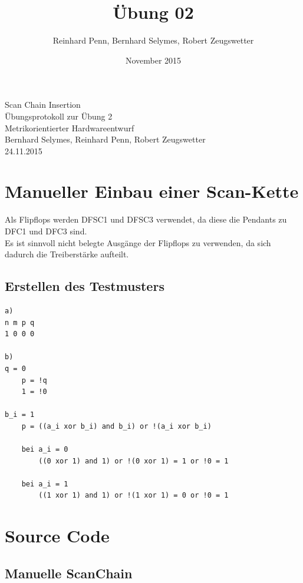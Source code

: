 \documentclass[12pt,a4paper]{article}
\begin{document}
\title{Übung 02}
\author{Reinhard Penn, Bernhard Selymes, Robert Zeugswetter}
\date{November 2015}

\normalsize



\newcommand{\Uebung}{ScanChainInsertion}
\newcommand{\srcpath}{../../src}
\newcommand{\simpath}{../../sim}
\newcommand{\synpath}{../../syn}



\begin{center}
Scan Chain Insertion\\
Übungsprotokoll zur Übung 2\\
Metrikorientierter Hardwareentwurf\\
Bernhard Selymes, Reinhard Penn, Robert Zeugswetter\\
24.11.2015
\end{center}


\section{Manueller Einbau einer Scan-Kette}
Als Flipflops werden DFSC1 und DFSC3 verwendet, da diese die Pendants zu DFC1 und DFC3 sind.\\
Es ist sinnvoll nicht belegte Ausgänge der Flipflops zu verwenden, da sich dadurch die Treiberstärke aufteilt.

\subsection{Erstellen des Testmusters}
\begin{verbatim}
a)
n m p q
1 0 0 0

b)
q = 0
	p = !q
	1 = !0

b_i = 1
	p = ((a_i xor b_i) and b_i) or !(a_i xor b_i)
	
	bei a_i = 0
		((0 xor 1) and 1) or !(0 xor 1) = 1 or !0 = 1
		
	bei a_i = 1
		((1 xor 1) and 1) or !(1 xor 1) = 0 or !0 = 1
\end{verbatim}

\section{Source Code}
\subsection{Manuelle ScanChain}

\end{document}
